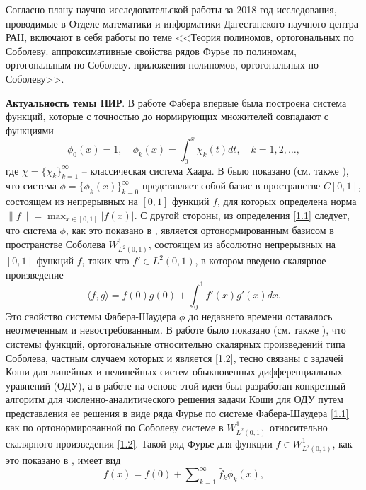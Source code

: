 \Introduction

Согласно плану научно-исследовательской работы за 2018 год исследования, проводимые в Отделе математики и информатики Дагестанского научного центра РАН, включают в себя работы по теме
<<Теория полиномов, ортогональных по Соболеву. аппроксимативные свойства рядов Фурье по полиномам, ортогональным по Соболеву. приложения полиномов, ортогональных по Соболеву>>.

\textbf{Актуальность темы НИР}.
В работе Фабера \cite{Faber} впервые была построена система функций, которые с точностью до нормирующих множителей совпадают с функциями
\begin{equation}\label{1.1}
\phi_{0}(x)=1, \quad \phi_{k}(x)=\int_{0}^{x}\chi_k(t)dt, \quad k=1,2,\ldots,
\end{equation}
где  $\chi=\{\chi_k\}_{k=1}^\infty$ --   классическая система Хаара.
В \cite{Faber} было показано (см. также \cite{Shauder}), что  система $\phi=\{\phi_k(x)\}_{k=0}^\infty$  представляет собой базис в пространстве $C[0,1]$, состоящем из непрерывных на $[0,1]$ функций $f$, для которых определена норма $\|f\|=\max_{x\in[0,1]}|f(x)|$. С другой стороны, из определения \eqref{1.1} следует, что система $\phi$, как это показано в \cite{SharIzv2018},  является ортонормированным базисом в  пространстве Соболева $W^1_{L^2(0,1)}$, состоящем из абсолютно непрерывных на $[0,1]$ функций $f$, таких что $f'\in L^2(0,1)$, в котором введено скалярное произведение
\begin{equation}\label{1.2}
\langle f,g\rangle=f(0)g(0)+\int_{0}^1f'(x)g'(x)dx.
\end{equation}
Это свойство системы Фабера-Шаудера $\phi$ до недавнего времени \cite{SharIzv2018} оставалось неотмеченным и невостребованным. В работе \cite{SharIzv2018} было показано (см. также \cite{SharDiffur2018}), что системы функций, ортогональные относительно скалярных произведений типа Соболева, частным случаем которых и является \eqref{1.2}, тесно связаны с задачей Коши для линейных и нелинейных систем обыкновенных дифференциальных уравнений (ОДУ), а в работе  \cite{MMG2016} на основе этой идеи был разработан конкретный алгоритм для численно-аналитического решения задачи Коши для  ОДУ путем представления ее решения в виде ряда Фурье по системе Фабера-Шаудера \eqref{1.1} как по ортонормированной по Соболеву системе в $W^1_{L^2(0,1)}$ относительно скалярного произведения \eqref{1.2}. Такой ряд Фурье для функции $f\in W^1_{L^2(0,1)}$, как это показано в \cite{SharIzv2018}, имеет вид
\begin{equation}\label{1.3}
f(x)=f(0)+\sum\nolimits_{k=1}^\infty \hat f_k \phi_{k}(x),
\end{equation}
